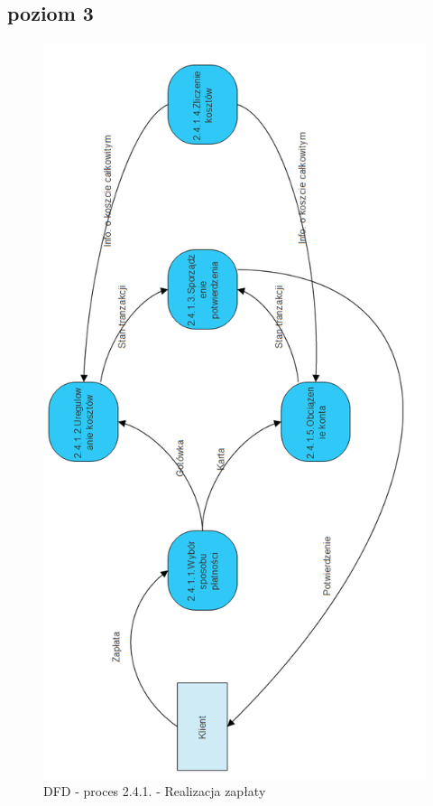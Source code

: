 \documentclass[a4paper, 11pt]{article}
\begin{document}
		
	\subsection{poziom 3}
	\indent
	\begin{figure}[H]%
			\center
			\includegraphics[scale=0.7]{Img/2-4-1.png}
			\caption{DFD - proces 2.4.1. - Realizacja zapłaty}
	\end{figure}		
	
\end{document}
